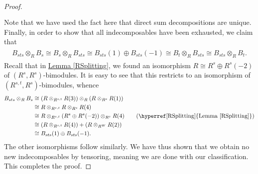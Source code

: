 \begin{proof}
\begin{align*}
\begin{split}
\end{split}
\end{align*}\newpage
\noindent Note that we have used the fact here that direct sum decompositions are unique. Finally, in order to show that all indecomposables have been exhausted, we claim that
\begin{align*}
\begin{split}
B_{sts} \otimes_R B_s \cong B_s \otimes_R B_{sts} \cong B_{sts}(1) \oplus B_{sts}(-1) \cong B_t \otimes_R B_{sts} \cong B_{sts} \otimes_R B_t.
\end{split}
\end{align*}
\noindent Recall that in \hyperref[RSplitting]{Lemma \ref*{RSplitting}}, we found an isomorphism $R \cong R^s \oplus R^s(-2)$ of $(R^s, R^s)$-bimodules. It is easy to see that this restricts to an isomorphism of $(R^{s,t}, R^s)$-bimodules, whence
\begin{align*}
B_{sts} \otimes_R B_s &\cong (R \otimes_{R^{s,t}} R(3)) \otimes_R (R \otimes_{R^s} R(1))\\
&\cong R \otimes_{R^{s,t}} R \otimes_{R^s} R(4)\\
&\cong R \otimes_{R^{s,t}} (R^s \oplus R^s(-2)) \otimes_{R^s} R(4) \tag*{(\hyperref[RSplitting]{Lemma \ref*{RSplitting}})}\\
&\cong (R \otimes_{R^{s,t}} R(4)) + (R \otimes_{R^W} R(2))\\
&\cong B_{sts}(1) \oplus B_{sts}(-1).
\end{align*}
\noindent The other isomorphisms follow similarly. We have thus shown that we obtain no new indecomposables by tensoring, meaning we are done with our classification. This completes the proof.
\end{proof}\\


